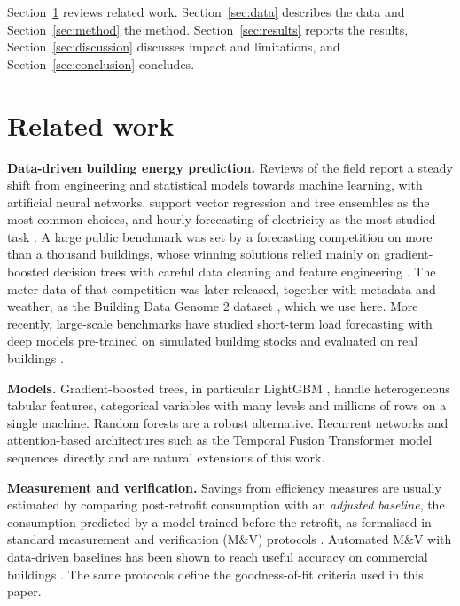\documentclass[11pt,a4paper]{article}
\begin{document}
Section~\ref{sec:related} reviews related work. Section~\ref{sec:data} describes the data and
Section~\ref{sec:method} the method. Section~\ref{sec:results} reports the results, Section~\ref{sec:discussion}
discusses impact and limitations, and Section~\ref{sec:conclusion} concludes.

\section{Related work}\label{sec:related}

\textbf{Data-driven building energy prediction.} Reviews of the field report a steady shift from engineering and
statistical models towards machine learning, with artificial neural networks, support vector regression and
tree ensembles as the most common choices, and hourly forecasting of electricity as the most studied
task \citep{amasyali2018review}. A large public benchmark was set by a forecasting competition on more than a
thousand buildings, whose winning solutions relied mainly on gradient-boosted decision trees with careful data
cleaning and feature engineering \citep{miller2020gepiii}. The meter data of that competition was later released,
together with metadata and weather, as the Building Data Genome 2 dataset \citep{miller2020bdg2}, which we use here.
More recently, large-scale benchmarks have studied short-term load forecasting with deep models pre-trained on
simulated building stocks and evaluated on real buildings \citep{emami2023buildingsbench}.

\textbf{Models.} Gradient-boosted trees, in particular LightGBM \citep{ke2017lightgbm}, handle heterogeneous tabular
features, categorical variables with many levels and millions of rows on a single machine. Random forests
\citep{breiman2001random} are a robust alternative. Recurrent networks \citep{hochreiter1997lstm} and attention-based
architectures such as the Temporal Fusion Transformer \citep{lim2021tft} model sequences directly and are natural
extensions of this work.

\textbf{Measurement and verification.} Savings from efficiency measures are usually estimated by comparing post-retrofit
consumption with an \emph{adjusted baseline}, the consumption predicted by a model trained before the retrofit, as
formalised in standard measurement and verification (M\&V) protocols \citep{ashrae2014guideline14,evo2022ipmvp}.
Automated M\&V with data-driven baselines has been shown to reach useful accuracy on commercial buildings
\citep{granderson2016accuracy}. The same protocols define the goodness-of-fit criteria used in this paper.
\end{document}
